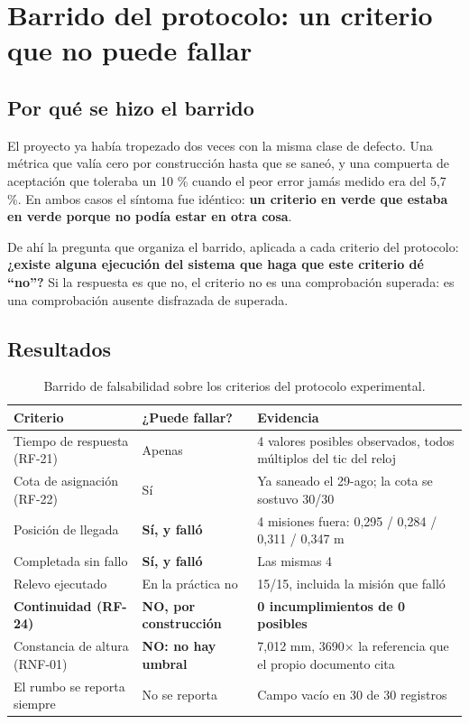 \documentclass[12pt,letterpaper]{article}
\begin{document}
\section{Barrido del protocolo: un criterio que no puede fallar}
\label{sec:barrido}

\subsection{Por qué se hizo el barrido}

El proyecto ya había tropezado dos veces con la misma clase de defecto. Una métrica que valía cero por construcción hasta que se saneó, y una compuerta de aceptación que toleraba un 10 \% cuando el peor error jamás medido era del 5,7 \%. En ambos casos el síntoma fue idéntico: \textbf{un criterio en verde que estaba en verde porque no podía estar en otra cosa}.

De ahí la pregunta que organiza el barrido, aplicada a cada criterio del protocolo: \textbf{¿existe alguna ejecución del sistema que haga que este criterio dé ``no''?} Si la respuesta es que no, el criterio no es una comprobación superada: es una comprobación ausente disfrazada de superada.

\subsection{Resultados}

\begin{table}[H]
    \centering
    \small
    \caption{Barrido de falsabilidad sobre los criterios del protocolo experimental.}
    \label{tab:barrido}
    \begin{tabular}{@{}p{4.5cm}p{3.0cm}p{6.0cm}@{}}
        \toprule
        \textbf{Criterio} & \textbf{¿Puede fallar?} & \textbf{Evidencia} \\ \midrule
        Tiempo de respuesta (RF-21) & Apenas & 4 valores posibles observados, todos múltiplos del tic del reloj \\ \addlinespace
        Cota de asignación (RF-22) & Sí & Ya saneado el 29-ago; la cota se sostuvo 30/30 \\ \addlinespace
        Posición de llegada & \textbf{Sí, y falló} & 4 misiones fuera: 0,295 / 0,284 / 0,311 / 0,347 m \\ \addlinespace
        Completada sin fallo & \textbf{Sí, y falló} & Las mismas 4 \\ \addlinespace
        Relevo ejecutado & En la práctica no & 15/15, incluida la misión que falló \\ \addlinespace
        \textbf{Continuidad (RF-24)} & \textbf{NO, por construcción} & \textbf{0 incumplimientos de 0 posibles} \\ \addlinespace
        Constancia de altura (RNF-01) & \textbf{NO: no hay umbral} & 7,012 mm, 3690$\times$ la referencia que el propio documento cita \\ \addlinespace
        El rumbo se reporta siempre & No se reporta & Campo vacío en 30 de 30 registros \\ \bottomrule
    \end{tabular}
\end{table}
\end{document}

